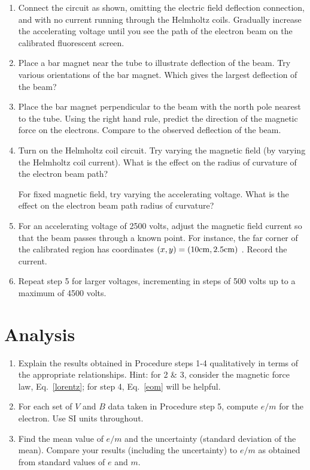\documentclass{article}
\begin{document}
\begin{enumerate}
\item Connect the circuit as shown, omitting the electric
field deflection connection,  and with no current running through the
Helmholtz coils. Gradually increase the accelerating voltage until you
see the path of the electron beam on the calibrated fluorescent
screen.



\item Place a bar magnet near the tube to illustrate deflection of the beam. Try various orientations of the bar
magnet. Which gives the largest deflection of the beam?


\item Place the bar magnet perpendicular to the beam with the north pole
nearest to the tube. Using the right hand rule, predict the direction
of the magnetic force on the electrons. Compare to the observed
deflection of the beam.


\item Turn on the Helmholtz coil circuit. Try varying the
magnetic field (by varying the Helmholtz coil current). What is the
effect on the radius of curvature of the electron beam path?

For fixed magnetic field, try varying the accelerating voltage. What is
the effect on the electron beam path radius of curvature?


\item For an accelerating voltage of 2500 volts, adjust the magnetic field
current so that the beam passes through a known point.  For instance, the far corner of the
calibrated region has coordinates $(x,y) =  (10 \rm{cm}, 2.5 \rm{cm})$ . Record the current.


\item Repeat step 5 for larger voltages, incrementing in
steps of 500 volts up to a maximum of 4500 volts.
\end{enumerate}

\section{Analysis}

\begin{enumerate}
\item Explain the results obtained in Procedure steps 1-4 qualitatively
in terms of the appropriate relationships. Hint: for 2 \& 3, consider
the magnetic force law, Eq.~\ref{lorentz}; for step 4, Eq.~\ref{eom} will be helpful.

\item For each set of $V$ and $B$ data taken in Procedure step 5, compute $e/m$
for the electron. Use SI units throughout.

\item Find the mean value of $e/m$ and the uncertainty (standard deviation of
the mean). Compare your results (including the uncertainty) to
$e/m$ as obtained from standard values of $e$ and $m$.
\end{enumerate}
\end{document}
